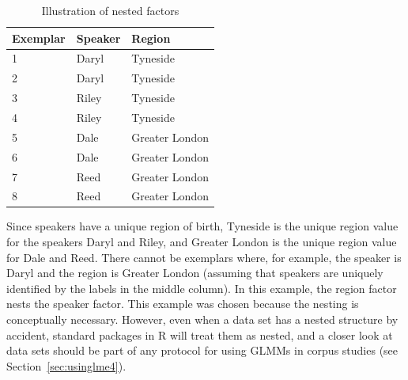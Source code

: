 \documentclass[a4paper,12pt]{article}
\begin{document}
\begin{table}
  \centering
  \begin{tabular}{lll}
    \toprule
    \textbf{Exemplar} & \textbf{Speaker}  & \textbf{Region}        \\
    \midrule
                    1 &           Daryl  &         Tyneside       \\
                    2 &           Daryl  &         Tyneside       \\
                    3 &           Riley  &         Tyneside       \\
                    4 &           Riley  &         Tyneside       \\
                    5 &           Dale   &         Greater London \\
                    6 &           Dale   &         Greater London \\
                    7 &           Reed   &         Greater London \\
                    8 &           Reed   &         Greater London \\
    \bottomrule
  \end{tabular}
  \caption{Illustration of nested factors}
  \label{tab:nested}
\end{table}

Since speakers have a unique region of birth, Tyneside is the unique region value for the speakers Daryl and Riley, and Greater London is the unique region value for Dale and Reed.
There cannot be exemplars where, for example, the speaker is Daryl and the region is Greater London (assuming that speakers are uniquely identified by the labels in the middle column).
In this example, the region factor nests the speaker factor.
This example was chosen because the nesting is conceptually necessary.
However, even when a data set has a nested structure by accident, standard packages in R will treat them as nested, and a closer look at data sets should be part of any protocol for using GLMMs in corpus studies (see Section~\ref{sec:usinglme4}).
\end{document}
